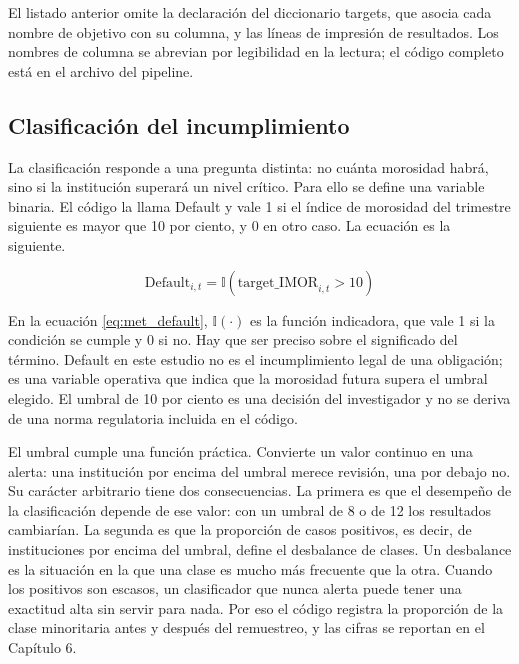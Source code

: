 El listado anterior omite la declaración del diccionario targets, que asocia cada nombre de objetivo con su columna, y las líneas de impresión de resultados. Los nombres de columna se abrevian por legibilidad en la lectura; el código completo está en el archivo del pipeline.

\subsection{Clasificación del incumplimiento}
La clasificación responde a una pregunta distinta: no cuánta morosidad habrá, sino si la institución superará un nivel crítico. Para ello se define una variable binaria. El código la llama Default y vale 1 si el índice de morosidad del trimestre siguiente es mayor que 10 por ciento, y 0 en otro caso. La ecuación es la siguiente.

\begin{equation}
\label{eq:met_default}
\text{Default}_{i,t} = \mathbb{I}\left(\text{target\_IMOR}_{i,t} > 10\right)
\end{equation}

En la ecuación \eqref{eq:met_default}, $\mathbb{I}(\cdot)$ es la función indicadora, que vale 1 si la condición se cumple y 0 si no. Hay que ser preciso sobre el significado del término. Default en este estudio no es el incumplimiento legal de una obligación; es una variable operativa que indica que la morosidad futura supera el umbral elegido. El umbral de 10 por ciento es una decisión del investigador y no se deriva de una norma regulatoria incluida en el código. %

El umbral cumple una función práctica. Convierte un valor continuo en una alerta: una institución por encima del umbral merece revisión, una por debajo no. Su carácter arbitrario tiene dos consecuencias. La primera es que el desempeño de la clasificación depende de ese valor: con un umbral de 8 o de 12 los resultados cambiarían. La segunda es que la proporción de casos positivos, es decir, de instituciones por encima del umbral, define el desbalance de clases. Un desbalance es la situación en la que una clase es mucho más frecuente que la otra. Cuando los positivos son escasos, un clasificador que nunca alerta puede tener una exactitud alta sin servir para nada. Por eso el código registra la proporción de la clase minoritaria antes y después del remuestreo, y las cifras se reportan en el Capítulo 6.

